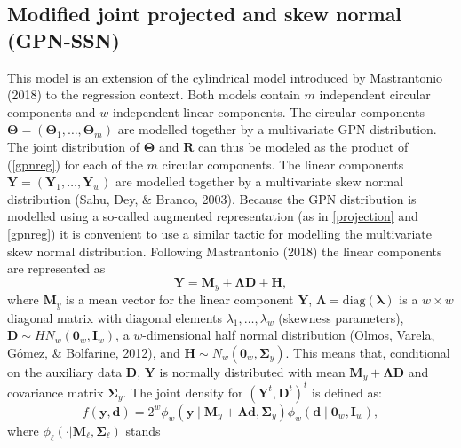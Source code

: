 \documentclass[12pt,]{article}
\begin{document}
\subsection{Modified joint projected and skew normal (GPN-SSN)}\label{CL-GPN_multivariate}

This model is an extension of the cylindrical model introduced by
Mastrantonio (2018) to the regression context. Both models contain \(m\)
independent circular components and \(w\) independent linear components.
The circular components
\(\boldsymbol{\Theta} = (\boldsymbol{\Theta}_1, \dots,  \boldsymbol{\Theta}_m)\)
are modelled together by a multivariate GPN distribution. The joint
distribution of \(\boldsymbol{\Theta}\) and \(\boldsymbol{R}\) can thus
be modeled as the product of (\ref{gpnreg}) for each of the \(m\)
circular components. The linear components
\(\boldsymbol{Y} = (\boldsymbol{Y}_1,  \dots, \boldsymbol{Y}_w)\) are
modelled together by a multivariate skew normal distribution (Sahu, Dey,
\& Branco, 2003). Because the GPN distribution is modelled using a
so-called augmented representation (as in \eqref{projection} and
\eqref{gpnreg}) it is convenient to use a similar tactic for modelling
the multivariate skew normal distribution. Following Mastrantonio (2018)
the linear components are represented as
\[\boldsymbol{Y} = \boldsymbol{M}_y + \boldsymbol{\Lambda}\boldsymbol{D} + \boldsymbol{H},\]
\noindent where \(\boldsymbol{M}_y\) is a mean vector for the linear
component \(\boldsymbol{Y}\),
\(\boldsymbol{\Lambda} = \text{diag}(\boldsymbol{\lambda})\) is a
\(w \times w\) diagonal matrix with diagonal elements
\(\lambda_1, \dots, \lambda_w\) (skewness parameters),
\(\boldsymbol{D} \sim HN_w(\boldsymbol{0}_w, \boldsymbol{I}_w)\), a
\(w\)-dimensional half normal distribution (Olmos, Varela, Gómez, \&
Bolfarine, 2012), and
\(\boldsymbol{H} \sim N_w(\boldsymbol{0}_w, \boldsymbol{\Sigma}_y)\).
This means that, conditional on the auxiliary data \(\boldsymbol{D}\),
\(\boldsymbol{Y}\) is normally distributed with mean
\(\boldsymbol{M}_y + \boldsymbol{\Lambda}\boldsymbol{D}\) and covariance
matrix \(\boldsymbol{\Sigma}_y\). The joint density for
\((\boldsymbol{Y}^t, \boldsymbol{D}^t)^t\) is defined as:
\begin{equation}\label{YDjoint}
f(\boldsymbol{y}, \boldsymbol{d}) = 2^w\phi_w(\boldsymbol{y} \mid \boldsymbol{M}_y + \boldsymbol{\Lambda}\boldsymbol{d}, \boldsymbol{\Sigma}_y) \phi_w(\boldsymbol{d} \mid \boldsymbol{0}_w, \boldsymbol{I}_w),\nonumber
\end{equation} \noindent where
\(\phi_\ell(\cdot|\boldsymbol{M}_\ell,\boldsymbol{\Sigma}_\ell)\) stands
\end{document}
